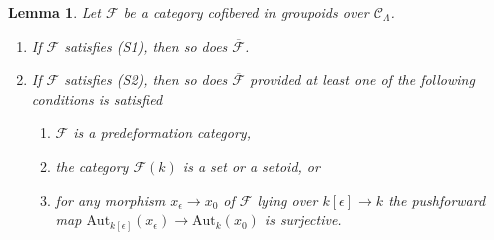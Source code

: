 \documentclass{stacks-project}
\theoremstyle{plain}
\newtheorem{lemma}[subsection]{Lemma}
\theoremstyle{definition}
\theoremstyle{remark}
\numberwithin{equation}{subsection}
\begin{document}
\begin{lemma}
\label{lemma-S1-S2-associated-functor}
Let $\mathcal{F}$ be a category cofibered in groupoids over
$\mathcal{C}_\Lambda$.
\begin{enumerate}
\item If $\mathcal{F}$ satisfies (S1), then so does
$\overline{\mathcal{F}}$.
\item If $\mathcal{F}$ satisfies (S2), then so does
$\overline{\mathcal{F}}$ provided at least one of the following conditions is
satisfied
\begin{enumerate}
\item $\mathcal{F}$ is a predeformation category,
\item the category $\mathcal{F}(k)$ is a set or a setoid, or
\item for any morphism $x_\epsilon \to x_0$ of $\mathcal{F}$
lying over $k[\epsilon] \to k$ the pushforward map
$\text{Aut}_{k[\epsilon]}(x_\epsilon) \to \text{Aut}_k(x_0)$
is surjective.
\end{enumerate}
\end{enumerate}
\end{lemma}
\end{document}
